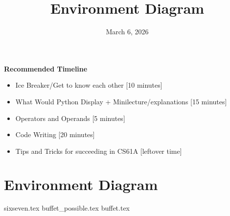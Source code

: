 \documentclass{exam}
\title{Environment Diagram}
\date{March 6, 2026}
\begin{document}
\maketitle
\begin{guide}
\textbf{Recommended Timeline}
\begin{itemize}
  \item Ice Breaker/Get to know each other [10 minutes]
  \item What Would Python Display + Minilecture/explanations [15 minutes]
  \item Operators and Operands [5 minutes]
  \item Code Writing [20 minutes]
  \item Tips and Tricks for succeeding in CS61A [leftover time]
\end{itemize}
\end{guide}

\section{Environment Diagram}
\begin{questions}
{sixseven.tex}
{buffet_possible.tex}
{buffet.tex}
\end{questions}
\end{document}
